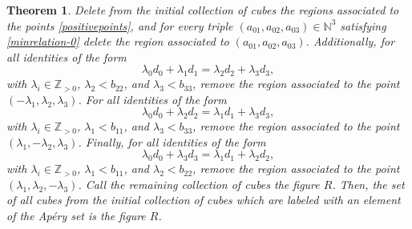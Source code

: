 \documentclass[12pt]{article}
\newtheorem{thm}{Theorem}[section]
\theoremstyle{remark}
\begin{document}
\begin{thm}\label{theoremprocedure}
     Delete from the initial collection of cubes the regions associated to the points \eqref{positivepoints}, and for every triple $(a_{01},a_{02},a_{03}) \in \mathbb{N}^3$ satisfying \eqref{minrelation-0} delete the region associated to $(a_{01},a_{02},a_{03})$. Additionally, for all identities of the form
    $$ \lambda_0d_0 + \lambda_1d_1=\lambda_2d_2 + \lambda_3d_3,  $$
    with $\lambda_i \in \mathbb{Z}_{>0}$, $\lambda_2 < b_{22}$, and $\lambda_3 < b_{33}$, remove the region associated to the point $(-\lambda_1,\lambda_2,\lambda_3)$. For all identities of the form
    $$ \lambda_0d_0 + \lambda_2d_2=\lambda_1d_1 + \lambda_3d_3,  $$
    with $\lambda_i \in \mathbb{Z}_{>0}$, $\lambda_1 < b_{11}$, and $\lambda_3 < b_{33}$, remove the region associated to the point $(\lambda_1,-\lambda_2,\lambda_3)$. Finally, for all identities of the form
    $$ \lambda_0d_0 + \lambda_3d_3=\lambda_1d_1 + \lambda_2d_2,  $$
    with $\lambda_i \in \mathbb{Z}_{>0}$, $\lambda_1 < b_{11}$, and $\lambda_2 < b_{22}$, remove the region associated to the point $(\lambda_1,\lambda_2,-\lambda_3)$.
    Call the remaining collection of cubes the figure $R$. Then, the set of all cubes from the initial collection of cubes which are labeled with an element of the Ap{\'e}ry set is the figure $R$.
\end{thm}
\end{document}
